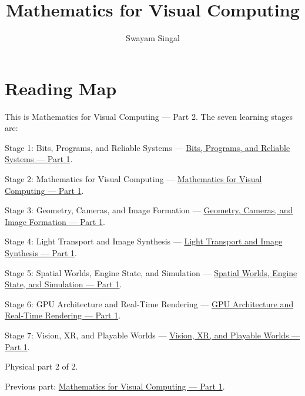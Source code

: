 \documentclass[11pt,twoside,openany]{book}
\title{Mathematics for Visual Computing}
\author{Swayam Singal}
\begin{document}
\maketitle
\begin{center}\end{center}
\chapter*{Reading Map}
\hypertarget{volume-reading-map}{}
\noindent This is Mathematics for Visual Computing --- Part 2. The seven learning stages are:
\par\noindent Stage 1: Bits, Programs, and Reliable Systems --- \href{../01-Bits-Programs-and-Reliable-Systems-P01/main.pdf}{Bits, Programs, and Reliable Systems — Part 1}.
\par\noindent Stage 2: Mathematics for Visual Computing --- \href{../02-Mathematics-for-Visual-Computing-P01/main.pdf}{Mathematics for Visual Computing — Part 1}.
\par\noindent Stage 3: Geometry, Cameras, and Image Formation --- \href{../03-Geometry-Cameras-and-Image-Formation-P01/main.pdf}{Geometry, Cameras, and Image Formation — Part 1}.
\par\noindent Stage 4: Light Transport and Image Synthesis --- \href{../04-Light-Transport-and-Image-Synthesis-P01/main.pdf}{Light Transport and Image Synthesis — Part 1}.
\par\noindent Stage 5: Spatial Worlds, Engine State, and Simulation --- \href{../05-Spatial-Worlds-Engine-State-and-Simulation-P01/main.pdf}{Spatial Worlds, Engine State, and Simulation — Part 1}.
\par\noindent Stage 6: GPU Architecture and Real-Time Rendering --- \href{../06-GPU-Architecture-and-Real-Time-Rendering-P01/main.pdf}{GPU Architecture and Real-Time Rendering — Part 1}.
\par\noindent Stage 7: Vision, XR, and Playable Worlds --- \href{../07-Vision-XR-and-Playable-Worlds-P01/main.pdf}{Vision, XR, and Playable Worlds — Part 1}.
\par\noindent Physical part 2 of 2.
\par\noindent Previous part: \href{../02-Mathematics-for-Visual-Computing-P01/main.pdf}{Mathematics for Visual Computing — Part 1}.
\tableofcontents
\mainmatter
\setcounter{chapter}{8}








\label{stagechaptersend:02-Mathematics-for-Visual-Computing}
\appendix
\end{document}
